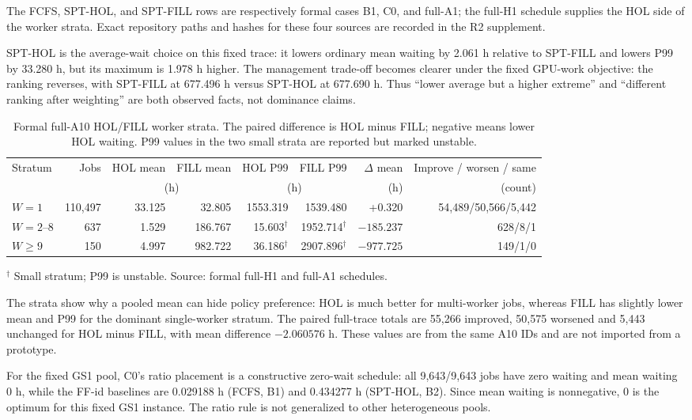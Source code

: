 The FCFS, SPT-HOL, and SPT-FILL rows are respectively formal cases B1, C0, and full-A1; the full-H1 schedule supplies the HOL side of the worker strata. Exact repository paths and hashes for these four sources are recorded in the R2 supplement.

SPT-HOL is the average-wait choice on this fixed trace: it lowers ordinary mean waiting by 2.061 h relative to SPT-FILL and lowers P99 by 33.280 h, but its maximum is 1.978 h higher. The management trade-off becomes clearer under the fixed GPU-work objective: the ranking reverses, with SPT-FILL at 677.496 h versus SPT-HOL at 677.690 h. Thus ``lower average but a higher extreme'' and ``different ranking after weighting'' are both observed facts, not dominance claims.

\begin{table}[H]\centering
\caption{Formal full-A10 HOL/FILL worker strata. The paired difference is HOL minus FILL; negative means lower HOL waiting. P99 values in the two small strata are reported but marked unstable.}
\label{tab:r2strata}
\setlength{\tabcolsep}{2.5pt}
\begin{tabular}{lrrrrrrr}
\toprule
Stratum & Jobs & HOL mean & FILL mean & HOL P99 & FILL P99 & $\Delta$ mean & Improve / worsen / same\\
 & & \multicolumn{2}{c}{(h)} & \multicolumn{2}{c}{(h)} & (h) & (count)\\
\midrule
$W=1$ &110,497&33.125&32.805&1553.319&1539.480&+0.320&54,489/50,566/5,442\\
$W=2$--8 &637&1.529&186.767&15.603$^\dagger$&1952.714$^\dagger$&$-185.237$&628/8/1\\
$W\ge9$ &150&4.997&982.722&36.186$^\dagger$&2907.896$^\dagger$&$-977.725$&149/1/0\\
\bottomrule
\end{tabular}
\smallskip\noindent$^\dagger$ Small stratum; P99 is unstable. Source: formal full-H1 and full-A1 schedules.
\end{table}

The strata show why a pooled mean can hide policy preference: HOL is much better for multi-worker jobs, whereas FILL has slightly lower mean and P99 for the dominant single-worker stratum. The paired full-trace totals are 55,266 improved, 50,575 worsened and 5,443 unchanged for HOL minus FILL, with mean difference $-2.060576$ h. These values are from the same A10 IDs and are not imported from a prototype.

For the fixed GS1 pool, C0's ratio placement is a constructive zero-wait schedule: all 9,643/9,643 jobs have zero waiting and mean waiting 0 h, while the FF-id baselines are 0.029188 h (FCFS, B1) and 0.434277 h (SPT-HOL, B2). Since mean waiting is nonnegative, 0 is the optimum for this fixed GS1 instance. The ratio rule is not generalized to other heterogeneous pools.


